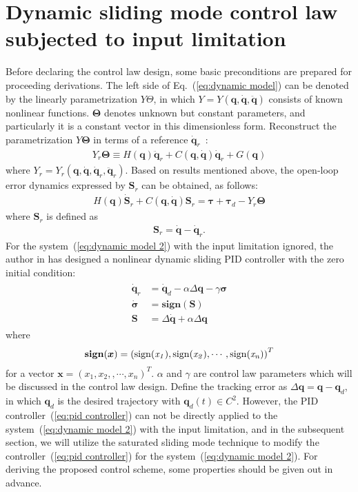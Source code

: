\documentclass[3p]{elsarticle}
\theoremstyle{plain}
\theoremstyle{remark}
\begin{document}
\section{Dynamic sliding mode control law subjected to input limitation}\label{sec:3}
Before declaring the control law design, some basic preconditions are prepared for proceeding derivations.  The left side of Eq.~(\ref{eq:dynamic model}) can be denoted by the linearly parametrization $Y\Theta$, in which $Y=Y(\bm q,\dot {\bm q},\ddot {\bm q})$ consists of known nonlinear functions. $\bm\Theta$ denotes unknown but constant parameters, and particularly it is a constant vector in this dimensionless form. Reconstruct the parametrization $Y\bm\Theta$ in terms of a reference $\dot{\bm q}_r$~\cite{parra2003dynamic}:
\begin{align}
 Y_r\bm\Theta\equiv H(\bm q)\ddot {\bm q}_r+C(\bm q,\dot {\bm q})\dot {\bm q}_r+G(\bm q)\label{eq:dynamic model 1}
\end{align}
where $Y_r = Y_r(\bm q,\dot{\bm q},\dot{\bm q}_r,\ddot{\bm q}_r)$. Based on results mentioned above, the open-loop error dynamics expressed by $\bm S_r$ can be obtained, as follows:
\begin{align}
H(\bm q)\dot {\bm S}_r+C(\bm q,\dot{\bm q})\bm S_r=\bm\tau +\bm\tau_d- Y_r\bm\Theta\label{eq:dynamic model 2}
\end{align}
where $\bm S_r$ is defined as
\begin{align}
\bm S_r=\dot {\bm q}-\dot {\bm q}_r.\label{eq:Sr1}
\end{align}
For the system~(\ref{eq:dynamic model 2}) with the input limitation ignored, the author in \cite{parra2003dynamic} has designed a nonlinear dynamic sliding PID controller with the zero initial condition:
\begin{align}\begin{split}
\dot {\bm q}_r&=\dot{\bm q}_d-\alpha\Delta\bm q-\gamma\bm\sigma\\
\dot{\bm\sigma}&=\mathbf{sign}(\bm S)\\
\bm S&=\Delta\dot{\bm q}+\alpha\Delta\bm q\label{eq:pid controller}
\end{split}\end{align}
where
\begin{align}
\mathbf{sign}(\bm x) = \left(\rm{sign}(\it{x_1}),\rm{sign}(\it{x_2}),\cdots,\rm{sign}(\it{x_n})\right)^T
\end{align}
for a vector $\bm x=\left(x_1,x_2,,\cdots,x_n\right)^T$. $\alpha$ and $\gamma$ are control law parameters which will be discussed in the control law design. Define the tracking error as $\Delta \bm q=\bm q-\bm q_d$, in which $\bm q_d$ is the desired trajectory with $\bm q_d(t)\in C^2$. However, the PID controller~(\ref{eq:pid controller}) can not be directly applied to the system~(\ref{eq:dynamic model 2}) with the input limitation, and in the subsequent section, we will utilize the saturated sliding mode technique to modify the controller~(\ref{eq:pid controller}) for the system~(\ref{eq:dynamic model 2}). For deriving the proposed control scheme, some properties should be given out in advance.
\end{document}
